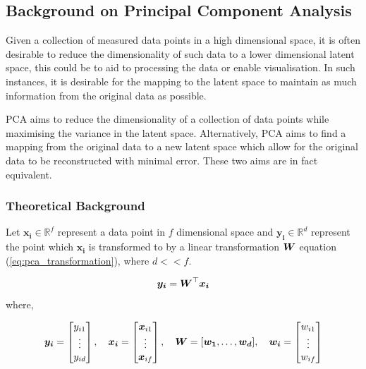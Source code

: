 \documentclass[12pt]{report}
\begin{document}
\subsection{Background on Principal Component Analysis}
Given a collection of measured data points in a high dimensional space, it is often desirable to reduce the dimensionality of such data to a lower dimensional latent space, this could be to aid to processing the data or enable visualisation.
In such instances, it is desirable for the mapping to the latent space to maintain as much information from the original data as possible.

PCA aims to reduce the dimensionality of a collection of data points while maximising the variance in the latent space.
Alternatively, PCA aims to find a mapping from the original data to a new latent space which allow for the original data to be reconstructed with minimal error.
These two aims are in fact equivalent.

\subsubsection{Theoretical Background}
Let $\bm{x_i} \in \mathbb{R}^f$ represent a data point in $f$ dimensional space and $\bm{y_i} \in \mathbb{R}^d$ represent the point which $\bm{x_i}$ is transformed to by a linear transformation ${\boldsymbol{{W}}}$ equation (\ref{eq:pca_transformation}), where $d << f$.

\begin{equation} \label{eq:pca_transformation}
    {\boldsymbol{{y_i}}} = {\boldsymbol{{W}}}^\top {\boldsymbol{{x_i}}}
\end{equation}
where,

\begin{equation*}
    {\boldsymbol{{y_i}}} = \begin{bmatrix} 
                y_{i1} \\
                \vdots \\
                y_{id} 
               \end{bmatrix},
    \quad
    {\boldsymbol{{x_i}}} = \begin{bmatrix} 
                {\boldsymbol{{x}}}_{i1} \\
                \vdots \\
                {\boldsymbol{{x}}}_{if} 
               \end{bmatrix},
    \quad
    {\boldsymbol{{W}}} = [
               {\boldsymbol{{w_1}}}, \dots, {\boldsymbol{{w_d}}}
              ],
    \quad
    {\boldsymbol{{w_i}}} = \begin{bmatrix} 
                w_{i1} \\
                \vdots \\
                w_{if} 
               \end{bmatrix}
\end{equation*}
\end{document}
